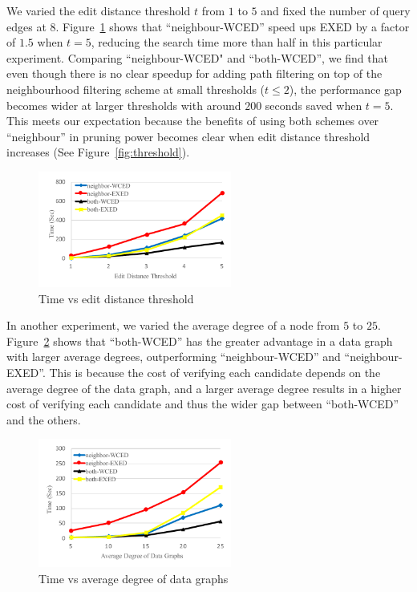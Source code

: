 \documentclass{sigmod}
\begin{document}
We varied the edit distance threshold $t$ from $1$ to $5$ and fixed the number of query edges at $8$. Figure~\ref{fig:10ktime} shows that ``neighbour-WCED'' speed ups EXED by a factor of $1.5$ when $t = 5$, reducing the search time more than half in this particular experiment. Comparing ``neighbour-WCED" and ``both-WCED'', we find that even though there is no clear speedup for adding path filtering on top of the neighbourhood filtering scheme at small thresholds ($t \leq 2$), the performance gap becomes wider at larger thresholds with around $200$ seconds saved when $t=5$. This meets our expectation because the benefits of using both schemes over ``neighbour'' in pruning power becomes clear when edit distance threshold increases (See Figure~\ref{fig:threshold}).

\begin{figure}[htbp] 
\setlength{\belowcaptionskip}{-1\baselineskip}
\centering\includegraphics[width=2.5in]{10ktime.pdf} 
\vspace{-1.5\baselineskip}
\caption{Time vs edit distance threshold}
\label{fig:10ktime}
\end{figure}

In another experiment, we varied the average degree of a node from $5$ to $25$. Figure~\ref{fig:density} shows that ``both-WCED'' has the greater advantage in a data graph with larger average degrees, outperforming ``neighbour-WCED'' and ``neighbour-EXED''. This is because the cost of verifying each candidate depends on the average degree of the data graph, and a larger average degree results in a higher cost of verifying each candidate and thus the wider gap between ``both-WCED'' and the others. 

\begin{figure}[htbp] 
\setlength{\abovecaptionskip}{-0.5\baselineskip}
\setlength{\belowcaptionskip}{-0.5\baselineskip}
\centering\includegraphics[width=2.5in]{density.pdf} 
\caption{Time vs average degree of data graphs}
\label{fig:density}
\end{figure}
\end{document}
